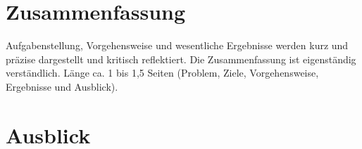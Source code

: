 
\chapter{Zusammenfassung}
Aufgabenstellung, Vorgehensweise und wesentliche Ergebnisse werden kurz und präzise dargestellt und kritisch
reflektiert. Die Zusammenfassung ist eigenständig verständlich. Länge ca. 1 bis 1,5 Seiten (Problem,
Ziele, Vorgehensweise, Ergebnisse und Ausblick).

\chapter{Ausblick}
